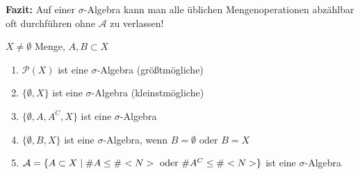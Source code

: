 \textbf{Fazit:} Auf einer $\sigma$-Algebra kann man alle üblichen Mengenoperationen abzählbar oft durchführen ohne $\mathcal{A}$ zu verlassen!

\begin{example}
	$X\neq\emptyset$ Menge, $A,B\subset X$
	\begin{enumerate}[label=(\alph*)]
		\item $\mathcal{P}(X)$ ist eine $\sigma$-Algebra (größtmögliche)
		\item $\{\emptyset,X\}$ ist eine $\sigma$-Algebra (kleinstmögliche)
		\item $\{\emptyset,A,A^C,X\}$ ist eine $\sigma$-Algebra
		\item $\{\emptyset,B,X\}$ ist eine $\sigma$-Algebra, wenn $B=\emptyset$ oder $B=X$
		\item $\mathcal{A}=\{A\subset X\mid \#A\le \#<N>\text{ oder } \#A^C\le \#<N>\}$ ist eine $\sigma$-Algebra
	\end{enumerate}
\end{example}